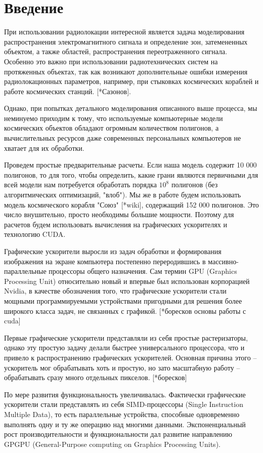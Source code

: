 \newpage
\section*{Введение}

При использовании радиолокации интересной является задача моделирования распространения электромагнитного сигнала и определение зон, затемененных объектом, а также областей, распространения переотраженного сигнала. Особенно это важно при использовании радиотехнических систем на протяженных объектах, так как возникают дополнительные ошибки измерения радиолокационных параметров, например, при стыковках космических кораблей и работе космических станций. [*Сазонов]. 

Однако, при попытках детального моделирования описанного выше процесса, мы неминуемо приходим к тому, что используемые компьютерные модели космических объектов обладают огромным количеством полигонов, а вычислительных ресурсов даже современных персональных компьютеров не хватает для их обработки. 

Проведем простые предварительные расчеты. Если наша модель содержит 10 000 полигонов, то для того, чтобы  определить, какие грани являются первичными для всей модели нам потребуется обработать порядка $ 10^8 $ полигонов (без алгоритмических оптимизаций, "влоб"). Мы же в работе будем использовать модель космического корабля "Союз" [*wiki], содержащий 152 000 полигонов. Это число внушительно, просто необходимы большие мощности. Поэтому для расчетов будем использовать вычисления на графических ускорителях и технологию CUDA. 

Графические ускорители выросли из задач обработки и формирования изображения на экране компьютера постепенно переродившись в массивно-параллельные процессоры общего назначения. Сам термин GPU (Graphics Processing Unit) относительно новый и впервые был использован корпорацией Nvidia, в качестве обозначения того, что графические ускорители стали мощными программируемыми устройствами пригодными для решения более широкого класса задач, не связанных с графикой. [*боресков основы работы с cuda]

Первые графические ускорители представляли из себя простые растеризаторы, однако эту простую задачу делали быстрее универсального процессора, что и привело к распространению графических ускорителей. Основная причина этого -- ускоритель мог обрабатывать хоть и простую, но зато масштабную работу -- обрабатывать сразу много отдельных пикселов. [*боресков]

По мере развития функциональность увеличивалась. Фактически графические ускорители стали представлять из себя SIMD-процессоры (Single Instruction Multiple Data), то есть параллельные устройства, способные одновременно выполнять одну и ту же операцию над многими данными. Экспоненциальный рост производительности и функциональности дал развитие направлению GPGPU (General-Purpose computing on Graphics Processing Units). 

